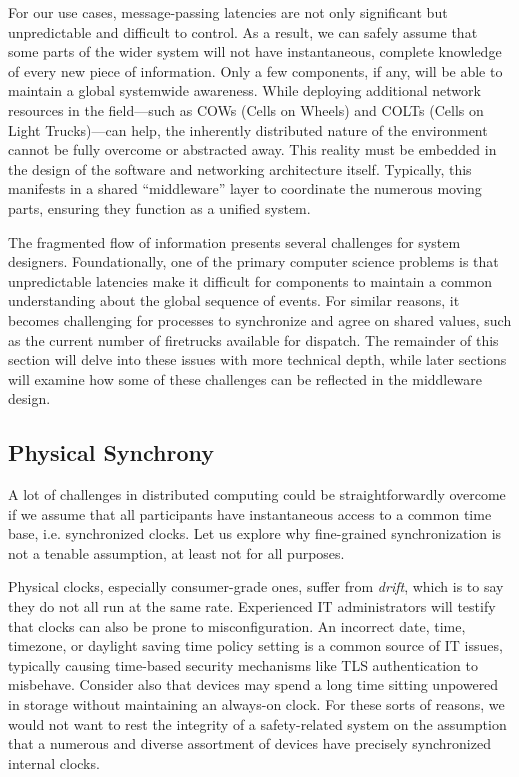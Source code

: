 \documentclass[]             %
{NASA}                       %
\theoremstyle{definition}
\begin{document}
For our use cases, message-passing latencies are not only significant
but unpredictable and difficult to control. As a result, we can safely
assume that some parts of the wider system will not have
instantaneous, complete knowledge of every new piece of
information. Only a few components, if any, will be able to maintain a
global systemwide awareness. While deploying additional network
resources in the field—such as COWs (Cells on Wheels) and COLTs (Cells
on Light Trucks)—can help, the inherently distributed nature of the
environment cannot be fully overcome or abstracted away. This reality
must be embedded in the design of the software and networking
architecture itself. Typically, this manifests in a shared
``middleware'' layer to coordinate the numerous moving parts, ensuring
they function as a unified system.

The fragmented flow of information presents several challenges for
system designers. Foundationally, one of the primary computer science
problems is that unpredictable latencies make it difficult for
components to maintain a common understanding about the global
sequence of events. For similar reasons, it becomes challenging for
processes to synchronize and agree on shared values, such as the
current number of firetrucks available for dispatch. The remainder of
this section will delve into these issues with more technical depth,
while later sections will examine how some of these challenges can be
reflected in the middleware design.

\subsection{Physical Synchrony}
\label{ssec:physical-synchrony}
A lot of challenges in distributed computing could be
straightforwardly overcome if we assume that all participants have
instantaneous access to a common time base, i.e.  synchronized
clocks. Let us explore why fine-grained synchronization is not a
tenable assumption, at least not for all purposes.

Physical clocks, especially consumer-grade ones, suffer from
\emph{drift}, which is to say they do not all run at the same
rate. Experienced IT administrators will testify that clocks can also
be prone to misconfiguration. An incorrect date, time, timezone, or
daylight saving time policy setting is a common source of IT issues,
typically causing time-based security mechanisms like TLS
authentication to misbehave. Consider also that devices may spend a
long time sitting unpowered in storage without maintaining an
always-on clock. For these sorts of reasons, we would not want to rest
the integrity of a safety-related system on the assumption that a
numerous and diverse assortment of devices have precisely synchronized
internal clocks.
\end{document}
